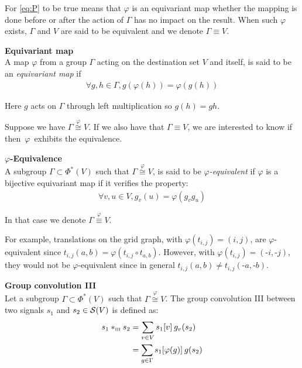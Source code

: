 For \eqref{eq:P} to be true means that $\varphi$ is an equivariant map \ie whether the mapping is done before or after the action of $\Gamma$ has no impact on the result. When such $\varphi$ exists, $\Gamma$ and $V$ are said to be equivalent and we denote $\Gamma \equiv V$.

\begin{definition}\textbf{Equivariant map}\\
A map $\varphi$ from a group $\Gamma$ acting on the destination set $V$ and itself, is said to be an \emph{equivariant map} if
\begin{gather*}
\forall g, h \in \Gamma, g(\varphi(h)) = \varphi(g(h))
\end{gather*}
\label{def:eqmap}
\end{definition}

\begin{remark} Here $g$ acts on $\Gamma$ through left multiplication so $g(h) = gh$.
\end{remark}

Suppose we have $\Gamma \overset{\varphi}{\cong} V$. If we also have that $\Gamma \equiv V$, we are interested to know if then~$\varphi$~exhibits the equivalence.

\begin{definition}\textbf{$\varphi$-Equivalence}\\
A subgroup $\Gamma \subset \Phi^*(V)$ such that $\Gamma \overset{\varphi}{\cong} V$, is said to be \emph{$\varphi$-equivalent} if $\varphi$ is a bijective equivariant map \ie if it verifies the property:
\begin{gather}
\forall v, u \in V, g_v(u) = \varphi(g_vg_u) \label{eq:P}%
\end{gather}
\end{definition}

In that case we denote $\Gamma \overset{\varphi}{\equiv} V$.

\begin{remark}
For example, translations on the grid graph, with $\varphi(t_{i,j}) = (i,j)$, are $\varphi$-equivalent since $t_{i,j}(a,b) = \varphi(t_{i,j} \circ t_{a,b})$. However, with $\varphi(t_{i,j}) = (\text{-}i,\text{-}j)$, they would not be $\varphi$-equivalent since in general $t_{i,j}(a,b) \neq t_{i,j}(\text{-}a,\text{-}b)$.
\end{remark}

\begin{definition}\textbf{Group convolution III}\\
Let a subgroup $\Gamma \subset \Phi^*(V)$ such that $\Gamma \overset{\varphi}{\cong} V$.
The group convolution III between two signals $s_1$ and $s_2 \in \cs(V)$ is defined as:
\begin{align}
s_1 \ast_{\III} s_2 & = \displaystyle \sum_{v \in V} s_1[v] \h{2} g_v(s_2)\label{eq:vdom}\\
& = \displaystyle \sum_{g \in \Gamma} s_1[\varphi(g)] \h{2} g(s_2) \label{eq:premix}
\end{align}
\label{def:conv3}
\end{definition}

